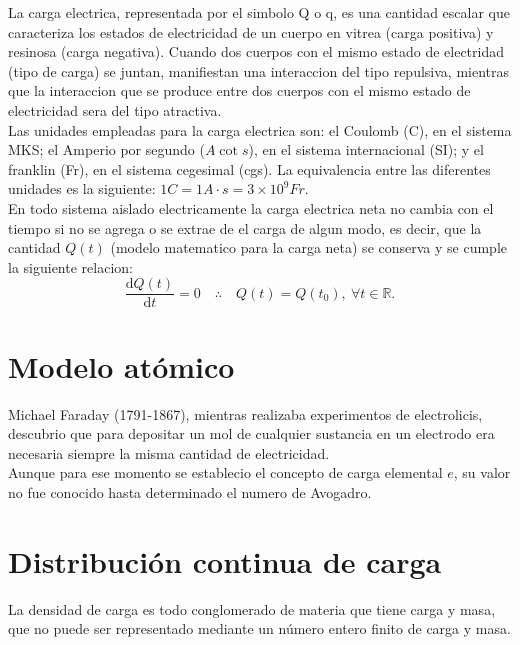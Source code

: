\documentclass[a4paper,10pt]{article}
\begin{document}
La carga electrica, representada por el simbolo Q o q, es una cantidad escalar que caracteriza los estados de
electricidad de un cuerpo en vitrea (carga positiva) y resinosa (carga negativa). Cuando dos cuerpos con el
mismo estado de electridad (tipo de carga) se juntan, manifiestan una interaccion del tipo repulsiva,
mientras que la interaccion que se produce entre dos cuerpos con el mismo estado de electricidad sera del tipo
atractiva.\\

Las unidades empleadas para la carga electrica son: el Coulomb (C), en el sistema MKS; el Amperio por segundo
($A\cot s$), en el sistema internacional (SI); y el franklin (Fr), en el sistema cegesimal (cgs). La equivalencia
entre las diferentes unidades es la siguiente: $1C = 1A\cdot s=3\times10^{9}Fr$.\\ 

En todo sistema aislado electricamente la carga electrica neta no cambia con el tiempo si no se agrega o se
extrae de el carga de algun modo, es decir, que la cantidad $Q(t)$ (modelo matematico para la carga neta) se
conserva y se cumple la siguiente relacion:\\
\begin{equation*}
    \frac{\mathrm{d}Q(t)}{\mathrm{d}t}=0 \quad\therefore\quad Q(t)=Q(t_{0}),\:\forall t\in\mathbb{R}.
\end{equation*}

\section*{Modelo at\'omico}

Michael Faraday (1791-1867), mientras realizaba experimentos de electrolicis, descubrio que para depositar un
mol de cualquier sustancia en un electrodo era necesaria siempre la misma cantidad de electricidad.\\

Aunque para ese momento se establecio el concepto de carga elemental $e$, su valor no fue conocido hasta
determinado el numero de Avogadro.\\

\section*{Distribuci\'on continua de carga}

La densidad de carga es todo conglomerado de materia que tiene carga y masa, que no puede ser representado
mediante un n\'umero entero finito de carga y masa.
\end{document}
